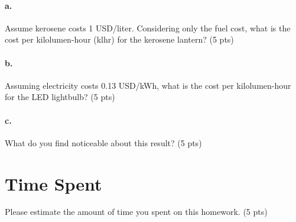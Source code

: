 \documentclass{article}
\newif\ifsolution
\newcommand{\solution}[1]
{\ifsolution
\vspace{10pt}
{\color{answer-color} #1}
\else\fi}
\newcommand{\ufrac}[2]{\frac{\textrm{#1}}{\textrm{#2}}}
\begin{document}
\paragraph{a.} Assume kerosene costs 1 USD/liter.  Considering only the fuel cost,
what is the cost per kilolumen-hour (klhr) for the kerosene lantern? (5 pts)

\solution{
The light output, lumens, and the fuel use are both rates.  We need to
multiply these by a unit of time to get the unit of light energy,
kilolumen-hours.  This should be reminiscent of multiplying the power by
time to get energy.
$$ \ufrac{30 ml/hour}{40 lumens} \cdot
   \ufrac{hour}{hour}
   = 0.75 \ufrac{ml}{lumen-hour}$$
$$ \ufrac{0.75 ml}{lumen-hour} \cdot
\ufrac{1000 lumen-hour}{klhr} \cdot
\ufrac{1 USD}{1000 ml} = 0.75 USD/klhr$$
}

\paragraph{b.} Assuming electricity costs 0.13 USD/kWh, what is the cost per
kilolumen-hour for the LED lightbulb? (5 pts)

\solution{
$$ \ufrac{10 watts}{900 lumens} \cdot
   \ufrac{hour}{hour} \cdot
   \ufrac{1 kWh}{1000 Wh} \cdot
   \ufrac{0.13 USD}{kWh} \cdot
   \ufrac{1000 lumen-hour}{klhr}
   = 0.0014 USD/klhr$$
}
\paragraph{c.} What do you find noticeable about this result? (5 pts)

\solution{
We see that per unit of light, kerosene light is over 500 times more
expensive (based on the fuel cost) than the electricity used to power an
LED lightbulb.
}


\section{Time Spent}

Please estimate the amount of time you spent on this homework. (5 pts)
\end{document}
